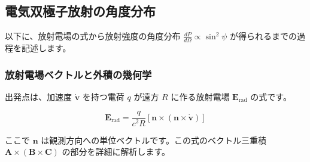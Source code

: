 \documentclass[a4paper,11pt]{bxjsarticle} %
\begin{document}





\subsection{電気双極子放射の角度分布}

以下に、放射電場の式から放射強度の角度分布 $\frac{dP}{d\Omega} \propto \sin^2\psi$ が得られるまでの過程を記述します。

\subsubsection{放射電場ベクトルと外積の幾何学}

出発点は、加速度 $\dot{\bm{v}}$ を持つ電荷 $q$ が遠方 $R$ に作る放射電場 $\bm{E}_{\mathrm{rad}}$ の式です。

\begin{equation}
    \bm{E}_{\mathrm{rad}} = \frac{q}{c^2 R} \left[ \bm{n} \times (\bm{n} \times \dot{\bm{v}}) \right]
\end{equation}

ここで $\bm{n}$ は観測方向への単位ベクトルです。この式のベクトル三重積 $\bm{A} \times (\bm{B} \times \bm{C})$ の部分を詳細に解析します。
\end{document}
